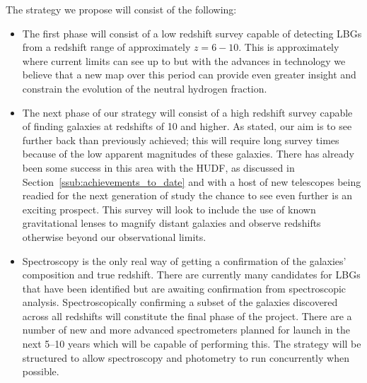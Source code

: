 	The strategy we propose will consist of the following:
	\begin{itemize}
		\item The first phase will consist of a low redshift survey capable of detecting LBGs from a redshift range of approximately $z=6-10$. This is approximately where current limits can see up to but with the advances in technology we believe that a new map over this period can provide even greater insight and constrain the evolution of the neutral hydrogen fraction.
		\item The next phase of our strategy will consist of a high redshift survey capable of finding galaxies at redshifts of 10 and higher. As stated, our aim is to see further back than previously achieved; this will require long survey times because of the low apparent magnitudes of these galaxies. There has already been some success in this area with the HUDF, as discussed in Section~\ref{ssub:achievements_to_date} and with a host of new telescopes being readied for the next generation of study the chance to see even further is an exciting prospect. This survey will look to include the use of known gravitational lenses to magnify distant galaxies and observe redshifts otherwise beyond our observational limits.
		\item Spectroscopy is the only real way of getting a confirmation of the galaxies' composition and true redshift. There are currently many candidates for LBGs that have been identified but are awaiting confirmation from spectroscopic analysis. Spectroscopically confirming a subset of the galaxies discovered across all redshifts will constitute the final phase of the project. There are a number of new and more advanced spectrometers planned for launch in the next 5--10 years which will be capable of performing this. The strategy will be structured to allow spectroscopy and photometry to run concurrently when possible.
	\end{itemize}
